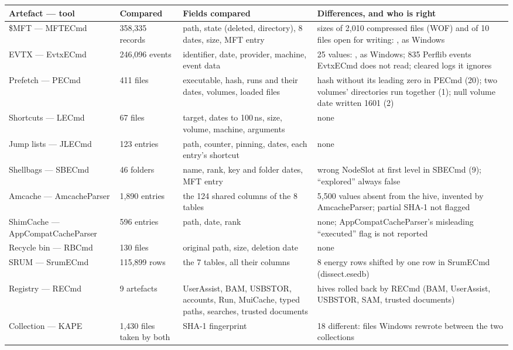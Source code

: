 \documentclass[11pt,a4paper,oneside]{report}
\begin{document}
\begin{longtable}{@{}L{3.0cm}L{2.3cm}L{4.6cm}L{5.0cm}@{}}
\toprule
\textbf{Artefact --- tool} & \textbf{Compared} & \textbf{Fields compared} & \textbf{Differences, and who is right} \\
\midrule\endhead
\$MFT --- MFTECmd & 358,335 records & path, state (deleted, directory), 8 dates, size, MFT entry & sizes of 2,010 compressed files (WOF) and of 10 files open for writing: \wac{}, as Windows \\
EVTX --- EvtxECmd & 246,096 events & identifier, date, provider, machine, event data & 25 values: \wac{}, as Windows; 835 Perflib events EvtxECmd does not read; cleared logs it ignores \\
Prefetch --- PECmd & 411 files & executable, hash, runs and their dates, volumes, loaded files & hash without its leading zero in PECmd (20); two volumes' directories run together (1); null volume date written 1601 (2) \\
Shortcuts --- LECmd & 67 files & target, dates to 100\,ns, size, volume, machine, arguments & none \\
Jump lists --- JLECmd & 123 entries & path, counter, pinning, dates, each entry's shortcut & none \\
Shellbags --- SBECmd & 46 folders & name, rank, key and folder dates, MFT entry & wrong NodeSlot at first level in SBECmd (9); ``explored'' always false \\
Amcache --- AmcacheParser & 1,890 entries & the 124 shared columns of the 8 tables & 5,500 values absent from the hive, invented by AmcacheParser; partial SHA-1 not flagged \\
ShimCache --- AppCompat\-Cache\-Parser & 596 entries & path, date, rank & none; AppCompatCacheParser's misleading ``executed'' flag is not reported \\
Recycle bin --- RBCmd & 130 files & original path, size, deletion date & none \\
SRUM --- SrumECmd & 115,899 rows & the 7 tables, all their columns & 8 energy rows shifted by one row in SrumECmd (dissect.esedb) \\
Registry --- RECmd & 9 artefacts & UserAssist, BAM, USBSTOR, accounts, Run, MuiCache, typed paths, searches, trusted documents & hives rolled back by RECmd (BAM, UserAssist, USBSTOR, SAM, trusted documents) \\
Collection --- KAPE & 1,430 files taken by both & SHA-1 fingerprint & 18 different: files Windows rewrote between the two collections \\
\bottomrule
\end{longtable}
\end{document}
